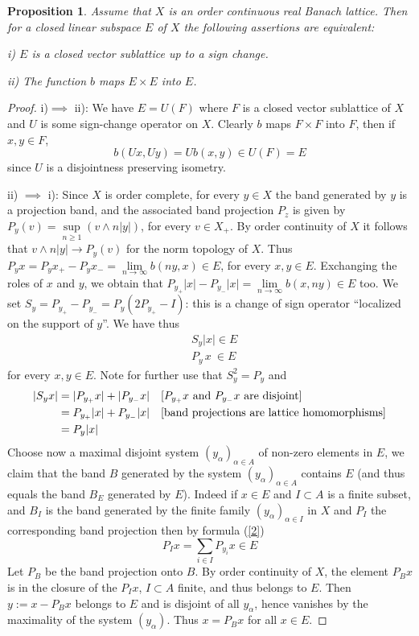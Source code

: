 \documentclass[11pt]{amsart}
\theoremstyle{plain}
\newtheorem{proposition}[theorem]{Proposition}
\theoremstyle{remark}
\begin{document}
\begin{proposition}\label{char-sublattice-up-to-sgn}
Assume that $X$ is an order continuous real Banach lattice. Then for a closed linear subspace $E$ of $X$ the following assertions are equivalent:

i) $E$ is a closed vector sublattice up to a sign change.

ii) The function  $b$ maps $E\times E$ into $E$.
\end{proposition}
\begin{proof}
i)$\implies$ ii): We have $E=U(F)$ where $F$ is a closed vector sublattice of $X$ and $U$ is some sign-change operator on $X$. Clearly $b$ maps $F\times F$ into $F$, then if $x,y\in F$,  
\[ b(Ux,Uy)=U b(x,y)\in U(F)=E\]
since $U$ is a disjointness preserving isometry.

ii) $\implies$ i): Since $X$ is order complete, for every  $y\in X$  the band generated by $y$ is a projection band, and the associated band projection $P_z$ is given by $P_y(v)=\sup\limits_{n\ge 1}(v\wedge n|y|)$, for every $v\in X_+$. By order continuity of $X$ it follows that $v\wedge n|y|\to P_y(v)$ for the norm topology of $X$.  Thus $P_y x= P_y x_{+}-P_y x_{-}=\lim\limits_{n\to \infty} b(ny,x)\in E$, for every $x,y\in E$. Exchanging the roles of  $x$ and $y$, we obtain that $P_{y_+}|x|-P_{y_-}|x|=\lim\limits_{n\to \infty} b(x,ny)\in E$ too. We set $S_y=P_{y_+}-P_{y_-}=P_y(2P_{y_+}-I)$: this is a change of sign operator ``localized on the support of $y$''. We have thus
\begin{align}
&S_y|x|\in E \label{1}\\
&P_y\,x\  \in E \label{2}
\end{align}
for every $x,y\in E$.
Note for further use that $S_y^2=P_y$ and 
\begin{align*}
|S_yx|&= |P_{y_+}x|+|P_{y_-}x| \quad \hbox{[$P_{y_+}x$ and $P_{y_-}x$ are disjoint]}\\
&= P_{y_+}|x|+P_{y_-}|x| \quad \hbox{[band projections are lattice homomorphisms]}\\
&=P_y|x|
\end{align*}
Choose now a maximal disjoint system $(y_\alpha)_{\alpha\in A}$ of non-zero elements in $E$, we claim that the band $B$ generated by the system $(y_\alpha)_{\alpha\in A}$ contains $E$ (and thus equals the band $B_E$ generated by $E$). Indeed if $x\in E$ and $I\subset A$ is a finite subset, and $B_I$ is the band generated by the finite family $(y_\alpha)_{\alpha\in I}$ in $X$ and $P_I$ the corresponding band projection then by formula (\ref{2})
\[P_I x=\sum_{i\in I} P_{y_i} x\in E\]
Let $P_B$ be the band projection onto $B$. By order continuity of $X$, the element $P_Bx$ is in the closure of the $P_I x$, $I\subset A$ finite, and thus belongs to $E$. Then $y:= x-P_B x$ belongs to $E$ and is disjoint of all $y_\alpha$, hence vanishes by the maximality of the system $(y_\alpha)$. Thus $x=P_B x$ for all $x\in E$.


\end{proof}
\end{document}
